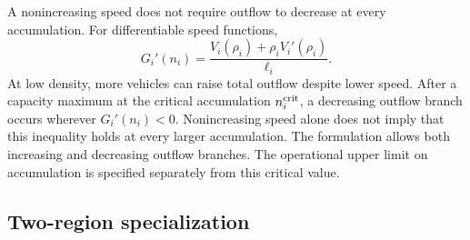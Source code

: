 \documentclass[preprint,12pt]{elsarticle}
\theoremstyle{definition}
\theoremstyle{plain}
\theoremstyle{definition}
\theoremstyle{plain}
\begin{document}
A nonincreasing speed does not require outflow to decrease at every
accumulation. For differentiable speed functions,
\begin{equation}
G_i'(n_i)=\frac{V_i(\rho_i)+\rho_i V_i'(\rho_i)}{\ell_i}.
\label{eq:speed-congestion-slope}
\end{equation}
At low density, more vehicles can raise total outflow despite lower
speed. After a capacity maximum at the critical accumulation
$n_i^{\rm crit}$, a decreasing outflow branch occurs wherever
$G_i'(n_i)<0$. Nonincreasing speed alone does not imply that this
inequality holds at every larger accumulation. The formulation allows
both increasing and decreasing outflow branches.
The operational upper limit on accumulation is specified separately from
this critical value.

\subsection{Two-region specialization}
\label{sec:two-region-model}
\end{document}
